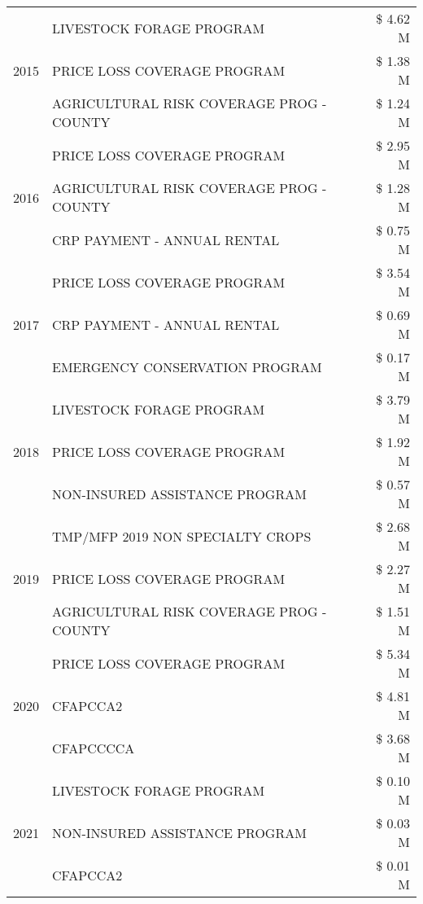 \begin{tabular}{llr}
\multirow[t]{3}{*}{2015} & LIVESTOCK FORAGE PROGRAM & \$ 4.62 M \\
 & PRICE LOSS COVERAGE PROGRAM & \$ 1.38 M \\
 & AGRICULTURAL RISK COVERAGE PROG - COUNTY & \$ 1.24 M \\
\cline{1-3}
\multirow[t]{3}{*}{2016} & PRICE LOSS COVERAGE PROGRAM & \$ 2.95 M \\
 & AGRICULTURAL RISK COVERAGE PROG - COUNTY & \$ 1.28 M \\
 & CRP PAYMENT - ANNUAL RENTAL & \$ 0.75 M \\
\cline{1-3}
\multirow[t]{3}{*}{2017} & PRICE LOSS COVERAGE PROGRAM & \$ 3.54 M \\
 & CRP PAYMENT - ANNUAL RENTAL & \$ 0.69 M \\
 & EMERGENCY CONSERVATION PROGRAM & \$ 0.17 M \\
\cline{1-3}
\multirow[t]{3}{*}{2018} & LIVESTOCK FORAGE PROGRAM & \$ 3.79 M \\
 & PRICE LOSS COVERAGE PROGRAM & \$ 1.92 M \\
 & NON-INSURED ASSISTANCE PROGRAM & \$ 0.57 M \\
\cline{1-3}
\multirow[t]{3}{*}{2019} & TMP/MFP 2019 NON SPECIALTY CROPS & \$ 2.68 M \\
 & PRICE LOSS COVERAGE PROGRAM & \$ 2.27 M \\
 & AGRICULTURAL RISK COVERAGE PROG - COUNTY & \$ 1.51 M \\
\cline{1-3}
\multirow[t]{3}{*}{2020} & PRICE LOSS COVERAGE PROGRAM & \$ 5.34 M \\
 & CFAPCCA2 & \$ 4.81 M \\
 & CFAPCCCCA & \$ 3.68 M \\
\cline{1-3}
\multirow[t]{3}{*}{2021} & LIVESTOCK FORAGE PROGRAM & \$ 0.10 M \\
 & NON-INSURED ASSISTANCE PROGRAM & \$ 0.03 M \\
 & CFAPCCA2 & \$ 0.01 M \\
\cline{1-3}
\bottomrule
\end{tabular}
